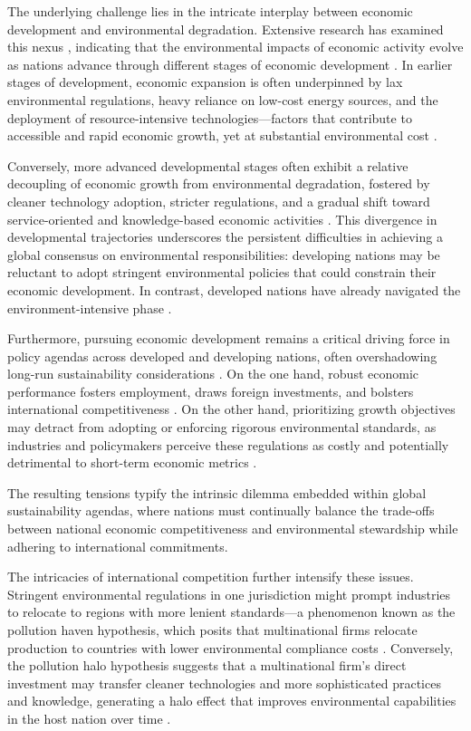 \documentclass[10pt]{article}
\begin{document}
The underlying challenge lies in the intricate interplay between economic development and environmental degradation. Extensive research has examined this nexus \citep{al2015investigating}, indicating that the environmental impacts of economic activity evolve as nations advance through different stages of economic development \citep{dougan2022relevance}. In earlier stages of development, economic expansion is often underpinned by lax environmental regulations, heavy reliance on low-cost energy sources, and the deployment of resource-intensive technologies---factors that contribute to accessible and rapid economic growth, yet at substantial environmental cost \citep{alvaradoEcologicalFootprintEconomic2021}.

Conversely, more advanced developmental stages often exhibit a relative decoupling of economic growth from environmental degradation, fostered by cleaner technology adoption, stricter regulations, and a gradual shift toward service-oriented and knowledge-based economic activities \citep{Wegrzyn2013The}. This divergence in developmental trajectories underscores the persistent difficulties in achieving a global consensus on environmental responsibilities: developing nations may be reluctant to adopt stringent environmental policies that could constrain their economic development. In contrast, developed nations have already navigated the environment-intensive phase \citep{zhangComparingDevelopedEmerging2024}.

Furthermore, pursuing economic development remains a critical driving force in policy agendas across developed and developing nations, often overshadowing long-run sustainability considerations \citep{eisenmengerSustainableDevelopmentGoals2020}. On the one hand, robust economic performance fosters employment, draws foreign investments, and bolsters international competitiveness \citep{bajajUnleashingEconomicPotential2024}. On the other hand, prioritizing growth objectives may detract from adopting or enforcing rigorous environmental standards, as industries and policymakers perceive these regulations as costly and potentially detrimental to short-term economic metrics \citep{xuTradeoffEnvironmentEconomy2023}.

The resulting tensions typify the intrinsic dilemma embedded within global sustainability agendas, where nations must continually balance the trade-offs between national economic competitiveness and environmental stewardship while adhering to international commitments.

The intricacies of international competition further intensify these issues. Stringent environmental regulations in one jurisdiction might prompt industries to relocate to regions with more lenient standards---a phenomenon known as the pollution haven hypothesis, which posits that multinational firms relocate production to countries with lower environmental compliance costs \citep{Ma_Shi_2023}. Conversely, the pollution halo hypothesis suggests that a multinational firm's direct investment may transfer cleaner technologies and more sophisticated practices and knowledge, generating a halo effect that improves environmental capabilities in the host nation over time \citep{abbassDoesTechnologyInnovation2022}.
\end{document}
